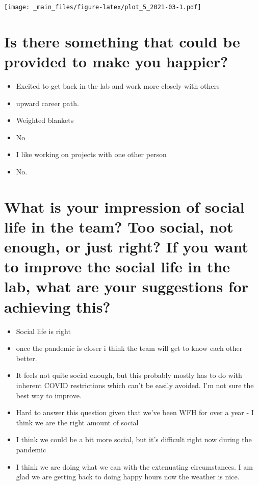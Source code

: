 \documentclass[
]{book}
\providecommand{\tightlist}{%
  \setlength{\itemsep}{0pt}\setlength{\parskip}{0pt}}
\begin{document}
\texttt{[image: \_main\_files/figure-latex/plot\_5\_2021-03-1.pdf]}

\hypertarget{is-there-something-that-could-be-provided-to-make-you-happier-1}{%
\section{Is there something that could be provided to make you happier?}\label{is-there-something-that-could-be-provided-to-make-you-happier-1}}

\begin{itemize}
\tightlist
\item
  Excited to get back in the lab and work more closely with others
\item
  upward career path.
\item
  Weighted blankets
\item
  No
\item
  I like working on projects with one other person
\item
  No.
\end{itemize}

\hypertarget{what-is-your-impression-of-social-life-in-the-team-too-social-not-enough-or-just-right-if-you-want-to-improve-the-social-life-in-the-lab-what-are-your-suggestions-for-achieving-this-1}{%
\section{What is your impression of social life in the team? Too social, not enough, or just right? If you want to improve the social life in the lab, what are your suggestions for achieving this?}\label{what-is-your-impression-of-social-life-in-the-team-too-social-not-enough-or-just-right-if-you-want-to-improve-the-social-life-in-the-lab-what-are-your-suggestions-for-achieving-this-1}}

\begin{itemize}
\tightlist
\item
  Social life is right
\item
  once the pandemic is closer i think the team will get to know each other better.
\item
  It feels not quite social enough, but this probably mostly has to do with inherent COVID restrictions which can't be easily avoided. I'm not sure the best way to improve.
\item
  Hard to answer this question given that we've been WFH for over a year - I think we are the right amount of social
\item
  I think we could be a bit more social, but it's difficult right now during the pandemic
\item
  I think we are doing what we can with the extenuating circumstances. I am glad we are getting back to doing happy hours now the weather is nice.
\end{itemize}
\end{document}
